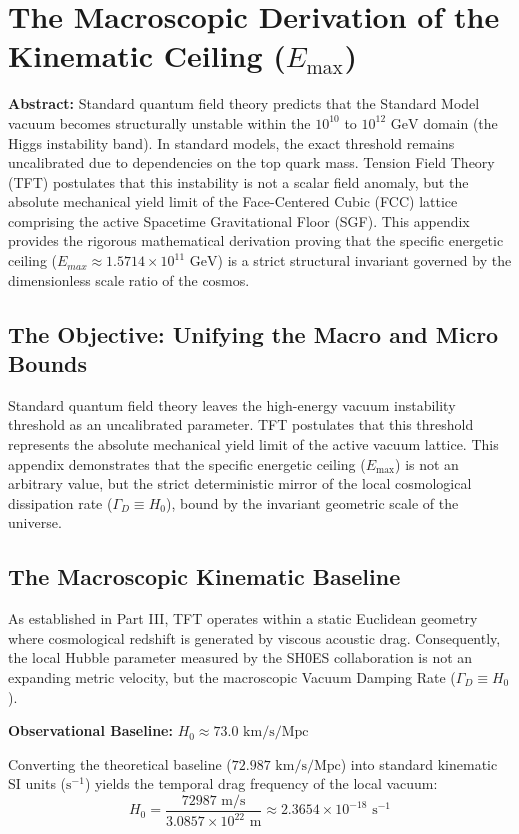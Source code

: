 \chapter{The Macroscopic Derivation of the Kinematic Ceiling ($E_{\text{max}}$)}
\label{app:kinematic_ceiling}

\textbf{Abstract:} Standard quantum field theory predicts that the Standard Model vacuum becomes structurally unstable within the $10^{10}$ to $10^{12} \text{ GeV}$ domain (the Higgs instability band). In standard models, the exact threshold remains uncalibrated due to dependencies on the top quark mass. Tension Field Theory (TFT) postulates that this instability is not a scalar field anomaly, but the absolute mechanical yield limit of the Face-Centered Cubic (FCC) lattice comprising the active Spacetime Gravitational Floor (SGF). This appendix provides the rigorous mathematical derivation proving that the specific energetic ceiling ($E_{max} \approx 1.5714 \times 10^{11} \text{ GeV}$) is a strict structural invariant governed by the dimensionless scale ratio of the cosmos.

\section{The Objective: Unifying the Macro and Micro Bounds}
Standard quantum field theory leaves the high-energy vacuum instability threshold as an uncalibrated parameter. TFT postulates that this threshold represents the absolute mechanical yield limit of the active vacuum lattice. This appendix demonstrates that the specific energetic ceiling ($E_{\text{max}}$) is not an arbitrary value, but the strict deterministic mirror of the local cosmological dissipation rate ($\Gamma_D \equiv H_0$), bound by the invariant geometric scale of the universe.

\section{The Macroscopic Kinematic Baseline}
As established in Part III, TFT operates within a static Euclidean geometry where cosmological redshift is generated by viscous acoustic drag. Consequently, the local Hubble parameter measured by the SH0ES collaboration is not an expanding metric velocity, but the macroscopic Vacuum Damping Rate ($\Gamma_D \equiv H_0$).

\textbf{Observational Baseline:} $H_0 \approx 73.0 \text{ km/s/Mpc}$

Converting the theoretical baseline ($72.987 \text{ km/s/Mpc}$) into standard kinematic SI units ($\text{s}^{-1}$) yields the temporal drag frequency of the local vacuum:
\[
H_0 = \frac{72987 \text{ m/s}}{3.0857 \times 10^{22} \text{ m}} \approx 2.3654 \times 10^{-18} \text{ s}^{-1}
\]

